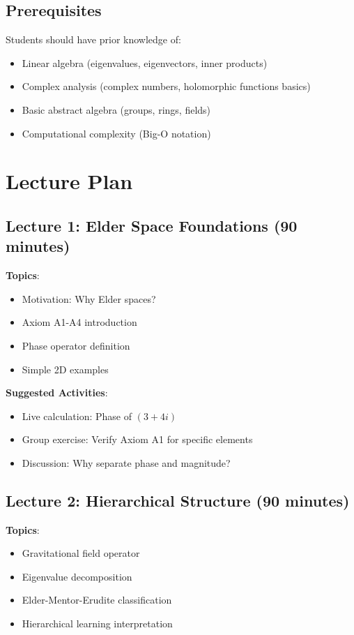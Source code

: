 \documentclass[12pt,a4paper]{article}
\begin{document}
\subsection{Prerequisites}

Students should have prior knowledge of:
\begin{itemize}
    \item Linear algebra (eigenvalues, eigenvectors, inner products)
    \item Complex analysis (complex numbers, holomorphic functions basics)
    \item Basic abstract algebra (groups, rings, fields)
    \item Computational complexity (Big-O notation)
\end{itemize}

\section{Lecture Plan}

\subsection{Lecture 1: Elder Space Foundations (90 minutes)}

\textbf{Topics}:
\begin{itemize}
    \item Motivation: Why Elder spaces?
    \item Axiom A1-A4 introduction
    \item Phase operator definition
    \item Simple 2D examples
\end{itemize}

\textbf{Suggested Activities}:
\begin{itemize}
    \item Live calculation: Phase of $(3 + 4i)$
    \item Group exercise: Verify Axiom A1 for specific elements
    \item Discussion: Why separate phase and magnitude?
\end{itemize}

\subsection{Lecture 2: Hierarchical Structure (90 minutes)}

\textbf{Topics}:
\begin{itemize}
    \item Gravitational field operator
    \item Eigenvalue decomposition
    \item Elder-Mentor-Erudite classification
    \item Hierarchical learning interpretation
\end{itemize}
\end{document}
